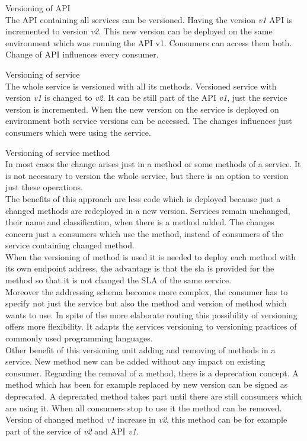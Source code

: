 \begin{description}
\item{Versioning of API} \\
The API containing all services can be versioned. Having the version \emph{v1} API is incremented to version \emph{v2}. This new version can be deployed on the same environment which was running the API v1. Consumers can access them both. Change of API influences every consumer.
\item{Versioning of service} \\
  The whole service is versioned with all its methods. Versioned service with version \emph{v1} is changed to \emph{v2}. It can be still part of the API \emph{v1}, just the service version is incremented. When the new version on the service is deployed on environment both service versions can be accessed. The changes influences just consumers which were using the service.
\item{Versioning of service method} \\
  In most cases the change arises just in a method or some methods of a service. It is not necessary to version the whole service, but there is an option to version just these operations. \\
  The benefits of this approach are less code which is deployed because just a changed methods are redeployed in a new version. Services remain unchanged, their name and classification, when there is a method added. The changes concern just a consumers which use the method, instead of consumers of the service containing changed method. \\
  When the versioning of method is used it is needed to deploy each method with its own endpoint address, the advantage is that the \gls{sla} is provided for the method so that it is not changed the SLA of the same service.\\
  Moreover the addressing schema becomes more complex, the consumer has to specify not just the service but also the method and version of method which wants to use.
  In spite of the more elaborate routing this possibility of versioning offers more flexibility. It adapts the services versioning to versioning practices of commonly used programming languages. \\
Other benefit of this versioning unit adding and removing of methods in a service. New method new can be added without any impact on existing consumer. Regarding the removal of a method, there is a deprecation concept. A method which has been for example replaced by new version can be signed as deprecated. A deprecated method takes part until there are still consumers which are using it. When all consumers stop to use it the method can be removed.\\
  Version of changed method \emph{v1} increase in \emph{v2}, this method can be for example part of the service of \emph{v2} and API \emph{v1}.
\end{description}

